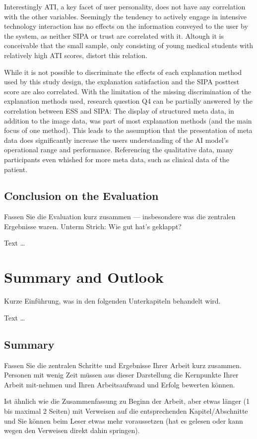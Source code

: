 \documentclass[11pt,a4paper,english]{scrreprt}
\newenvironment{comment}
  {\par\medskip
   \begingroup\color{olive}%
   }
 {\endgroup
  \medskip}
\begin{document}
Interestingly ATI, a key facet of user personality, does not have any correlation with the other variables. Seemingly the tendency to actively engage in intensive technology interaction has no effects on the information conveyed to the user by the system, as neither SIPA or trust are correlated with it. Altough it is conceivable that the small sample, only consisting of young medical students with relatively high ATI scores, distort this relation.

While it is not possible to discriminate the effects of each explanation method used by this study design, the explanation satisfaction and the SIPA posttest score are also correlated. With the limitation of the missing discrimination of the explanation methods used, research question Q4 can be partially answered by the correlation between ESS and SIPA: The display of structured meta data, in addition to the image data, was part of most explanation methods (and the main focus of one method). This leads to the assumption that the presentation of meta data does significantly increase the users understanding of the AI model's operational range and performance. Referencing the qualitative data, many participants even whished for more meta data, such as clinical data of the patient.

\section{Conclusion on the Evaluation}
\begin{comment}
Fassen Sie die Evaluation kurz zusammen — insbesondere was die zentralen Ergebnisse waren. Unterm Strich: Wie gut hat's geklappt?
\end{comment}

Text \dots

\newpage
\chapter{Summary and Outlook}
\begin{comment}
Kurze Einführung, was in den folgenden Unterkapiteln behandelt wird.
\end{comment}

Text \dots

\section{Summary}
\begin{comment}
Fassen Sie die zentralen Schritte und Ergebnisse Ihrer Arbeit kurz zusammen. Personen mit wenig Zeit müssen aus dieser Darstellung die Kernpunkte Ihrer Arbeit mit-nehmen und Ihren Arbeitsaufwand und Erfolg bewerten können.

Ist ähnlich wie die Zusammenfassung zu Beginn der Arbeit, aber etwas länger (1 bis maximal 2 Seiten) mit Verweisen auf die entsprechenden Kapitel/Abschnitte und Sie können beim Leser etwas mehr voraussetzen (hat es gelesen oder kann wegen den Verweisen direkt dahin springen).
\end{comment}
\end{document}
